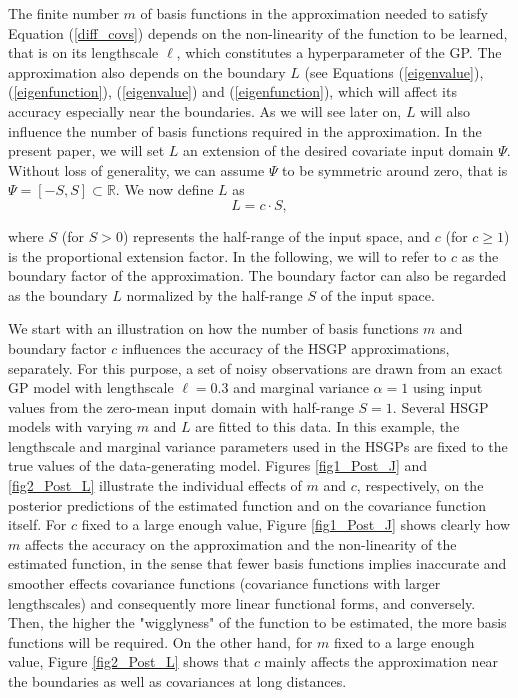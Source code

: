 \documentclass[]{interact}
\theoremstyle{plain}%
\theoremstyle{definition}
\theoremstyle{remark}
\begin{document}
The finite number $m$ of basis functions in the approximation needed to satisfy Equation (\ref{diff_covs}) depends on the non-linearity of the function to be learned, that is on its lengthscale $\ell$, which constitutes a hyperparameter of the GP. The approximation also depends on the boundary $L$ (see Equations (\ref{eigenvalue}), (\ref{eigenfunction}), (\ref{eigenvalue}) and (\ref{eigenfunction}), which will affect its accuracy especially near the boundaries. As we will see later on, $L$ will also influence the number of basis functions required in the approximation. In the present paper, we will set $L$ an extension of the desired covariate input domain $\Psi$. Without loss of generality, we can assume $\Psi$ to be symmetric around zero, that is $\Psi=[-S,S] \subset \mathbb{R}$. We now define $L$ as
%
\begin{equation}\label{eq:boundary}
L=c \cdot S,
\end{equation} 

\noindent where $S$ (for $S > 0$) represents the half-range of the input space, and $c$ (for $c \geq 1$) is the proportional extension factor. In the following, we will to refer to $c$ as the boundary factor of the approximation. The boundary factor can also be regarded as the boundary $L$ normalized by the half-range $S$ of the input space.

We start with an illustration on how the number of basis functions $m$ and boundary factor $c$ influences the accuracy of the HSGP approximations, separately. For this purpose, a set of noisy observations are drawn from an exact GP model with lengthscale $\ell=0.3$ and marginal variance $\alpha=1$ using input values from the zero-mean input domain with half-range $S=1$. Several HSGP models with varying $m$ and $L$ are fitted to this data. In this example, the lengthscale and marginal variance parameters used in the HSGPs are fixed to the true values of the data-generating model. 
Figures \ref{fig1_Post_J} and \ref{fig2_Post_L} illustrate the individual effects of $m$ and $c$, respectively, on the posterior predictions of the estimated function and on the covariance function itself. For $c$ fixed to a large enough value, Figure \ref{fig1_Post_J} shows clearly how $m$ affects the accuracy on the approximation and the non-linearity of the estimated function, in the sense that fewer basis functions implies inaccurate and smoother effects covariance functions (covariance functions with larger lengthscales) and consequently more linear functional forms, and conversely. 
Then, the higher the "wigglyness" of the function to be estimated, the more basis functions will be required. 
On the other hand, for $m$ fixed to a large enough value, Figure \ref{fig2_Post_L} shows that $c$ mainly affects the approximation near the boundaries as well as covariances at long distances.
\end{document}

